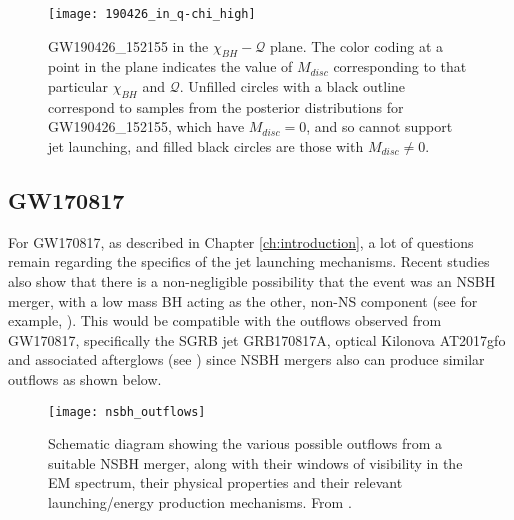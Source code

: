         \begin{figure}[H]
            \centering
            \texttt{[image: 190426\_in\_q-chi\_high]}
            \caption[GW190426 in the $\chi_{BH}-\mathcal{Q}$ plane]
            {
                GW190426\_152155 in the $\chi_{BH}-\mathcal{Q}$ plane. The color coding
                at a point in the plane indicates the value of $M_{disc}$ corresponding
                to that particular $\chi_{BH}$ and $\mathcal{Q}$.  Unfilled circles with
                a black outline correspond to samples from the posterior distributions
                for GW190426\_152155, which have $M_{disc} = 0$, and so cannot support
                jet launching, and filled black circles are those with $M_{disc} \neq
                0$.
            }
            \label{fig:mdisc_q_190426}
        \end{figure}

    \subsection{GW170817}

        For GW170817, as described in Chapter \ref{ch:introduction}, a lot of questions
        remain regarding the specifics of the jet launching mechanisms. Recent studies
        also show that there is a non-negligible possibility that the event was an NSBH
        merger, with a low mass BH acting as the other, non-NS component (see for
        example, \cite{hinderer_2019}). This would be compatible with the outflows
        observed from GW170817, specifically the SGRB jet GRB170817A, optical Kilonova
        AT2017gfo and associated afterglows (see \cite{abbott_2017}) since NSBH mergers
        also can produce similar outflows as shown below.

        \begin{figure}[H]
            \centering
            \texttt{[image: nsbh\_outflows]}
            \caption[EM outflows from NSBH mergers, from \cite{barbieri_2019a}]
            {
                Schematic diagram showing the various possible outflows from a suitable
                NSBH merger, along with their windows of visibility in the EM spectrum,
                their physical properties and their relevant launching/energy production
                mechanisms. From \cite{barbieri_2019a}.
            }
            \label{fig:nsbh_outflows}
        \end{figure}

